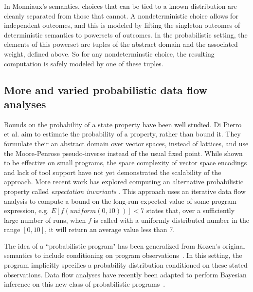 In Monniaux's semantics, choices that can be tied to a known
distribution are cleanly separated from those that cannot.
A nondeterministic choice allows for independent outcomes, and
this is modeled by lifting the singleton outcomes of deterministic
semantics to powersets of outcomes.
In the probabilistic setting, the elements of this powerset are
tuples of the abstract domain and the associated weight, defined
above.
So for any nondeterminstic choice, the resulting computation 
is safely modeled by one of these tuples.

\subsection{More and varied probabilistic data flow analyses}

Bounds on the probability of a state property have been well studied.
Di Pierro et al. \cite{di2013probabilistic} aim to estimate the probability of a property,
rather than bound it.  They formulate their an abstract 
domain over vector spaces, instead of lattices, and use
the Moore-Penrose pseudo-inverse instead of the usual fixed point.
While shown to be effective on small programs, the space
complexity of vector space encodings and lack of tool support
have not yet demonstrated the scalability of the approach.
More recent work has explored computing an alternative probabilistic
property called {\sl expectation invariants} \cite{chakarov2014expectation}.
This approach uses an iterative data flow analysis to 
compute a bound on the long-run expected value of
some program expression, e.g. $E[f(uniform(0,10))] < 7$ states that,
over a sufficiently large number of runs, when $f$ is called with
a uniformly distributed number in the range $[0,10]$, it will return
an average value less than 7.

The idea of a ``probabilistic program" has been generalized from
Kozen's original semantics to include conditioning on program
observations~\cite{Gordon2014}.
In this setting, the program implicitly specifies a probability 
distribution conditioned on these stated observations.
Data flow analyses have recently been adapted to perform Bayesian
inference on this new class of probabilistic 
programs~\cite{claret2013bayesian}.  
